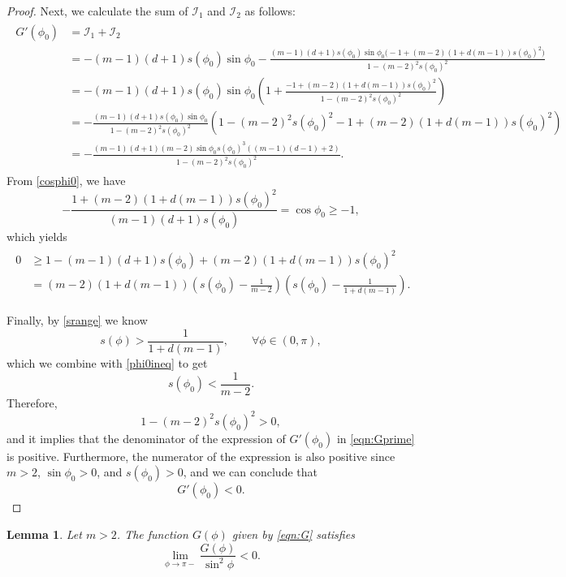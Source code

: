 \documentclass[11pt]{amsart}
\newtheorem{lemma}{Lemma}[section]
\newcommand{\dm}{d} %
\begin{document}
\begin{proof}
Next, we calculate the sum of $\mathcal{I}_1$ and $\mathcal{I}_2$ as follows:
\begin{align}
\begin{aligned}\label{eqn:Gprime}
G'(\phi_0)&=\mathcal{I}_1+\mathcal{I}_2\\
&=-(m-1)(\dm+1)s(\phi_0)\sin\phi_0-\frac{(m-1)(\dm+1)s(\phi_0)\sin\phi_0\big(-1+(m-2)(1+\dm(m-1))s(\phi_0)^2\big)}{1-(m-2)^2s(\phi_0)^2}\\[3pt]
&=-(m-1)(\dm+1)s(\phi_0)\sin\phi_0\left(
1+\frac{-1+(m-2)(1+\dm(m-1))s(\phi_0)^2}{1-(m-2)^2s(\phi_0)^2}
\right)\\[3pt]
&=-\frac{(m-1)(\dm+1)s(\phi_0)\sin\phi_0}{1-(m-2)^2s(\phi_0)^2}\left(
1-(m-2)^2s(\phi_0)^2-1+(m-2)(1+\dm(m-1))s(\phi_0)^2
\right)\\[3pt]
&=-\frac{(m-1)(\dm+1)(m-2)\sin\phi_0 s(\phi_0)^3\left((m-1)(\dm-1)+2\right)}{1-(m-2)^2s(\phi_0)^2}.
\end{aligned}
\end{align}
From \eqref{cosphi0}, we have
\[
-\frac{1+(m-2)(1+\dm(m-1))s(\phi_0)^2}{(m-1)(\dm+1)s(\phi_0)}=\cos\phi_0\geq -1,
\]
which yields
\begin{align}
\begin{aligned}\label{phi0ineq}
0&\geq 1-(m-1)(\dm+1)s(\phi_0)
+(m-2)(1+\dm(m-1))s(\phi_0)^2\\
&=(m-2)(1+\dm(m-1))\left(
s(\phi_0)-\frac{1}{m-2}
\right)\left(
s(\phi_0)-\frac{1}{1+\dm(m-1)}
\right).
\end{aligned}
\end{align}

Finally, by \eqref{srange} we know
\[
s(\phi)>\frac{1}{1+\dm(m-1)},\qquad\forall \phi\in(0, \pi),
\]
which we combine with \eqref{phi0ineq} to get
\[
s(\phi_0)<\frac{1}{m-2}.
\]
Therefore, 
\[
1-(m-2)^2s(\phi_0)^2>0,
\]
and it implies that the denominator of the expression of $G'(\phi_0)$ in  \eqref{eqn:Gprime} is positive. Furthermore, the numerator of the expression is also positive since $m>2$, $\sin\phi_0>0$, and $s(\phi_0)>0$, and we can conclude that
\[
G'(\phi_0)<0.
\]
\end{proof}

\begin{lemma}\label{lem:Gnearpi}
Let $m>2$. The function $G(\phi)$ given by \eqref{eqn:G} satisfies
\[
\lim_{\phi\to\pi-}\frac{G(\phi)}{\sin^2\phi}<0.
\]
\end{lemma}
\end{document}
